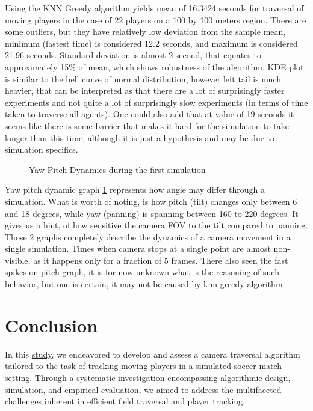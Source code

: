 Using the KNN Greedy algorithm yields mean of 16.3424 seconds for traversal of moving players in the case of 22 players on a 100 by 100 meters region. There are some outliers, but they have relatively low deviation from the sample mean, minimum (fastest time) is considered 12.2 seconds, and maximum is considered 21.96 seconds. Standard deviation is almost 2 second, that equates to approximately 15\% of mean, which shows robustness of the algorithm. KDE plot is similar to the bell curve of normal distribution, however left tail is much heavier, that can be interpreted as that there are a lot of surprisingly faster experiments and not quite a lot of surprisingly slow experiments (in terms of time taken to traverse all agents). One could also add that at value of 19 seconds it seems like there is some barrier that makes it hard for the simulation to take longer than this time, although it is just a hypothesis and may be due to simulation specifics.

\begin{figure}[!ht]
    \centering
    
    \caption{Yaw-Pitch Dynamics during the first simulation}
    \label{fig:yaw-pitch}
\end{figure}

Yaw pitch dynamic graph \ref{fig:yaw-pitch} represents how angle may differ through a simulation. What is worth of noting, is how pitch (tilt) changes only between 6 and 18 degrees, while yaw (panning) is spanning between 160 to 220 degrees. It gives us a hint, of how sensitive the camera FOV to the tilt compared to panning. Those 2 graphs completely describe the dynamics of a camera movement in a single simulation. Times when camera stops at a single point are almost non-visible, as it happens only for a fraction of 5 frames. There also seen the fast spikes on pitch graph, it is for now unknown what is the reasoning of such behavior, but one is certain, it may not be caused by knn-greedy algorithm.

\section{Conclusion}
In this \href{https://github.com/mikecarti/hse-cam2023}{\color{blue}study}, we endeavored to develop and assess a camera traversal algorithm tailored to the task of tracking moving players in a simulated soccer match setting. Through a systematic investigation encompassing algorithmic design, simulation, and empirical evaluation, we aimed to address the multifaceted challenges inherent in efficient field traversal and player tracking.

